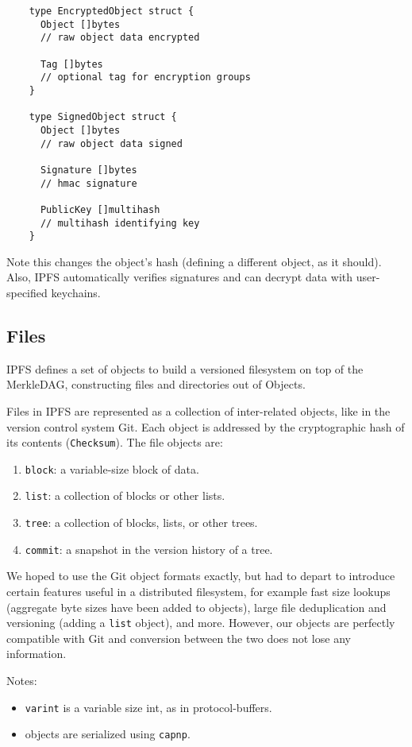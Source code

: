 \documentclass{sig-alternate}
\begin{document}
\begin{verbatim}
    type EncryptedObject struct {
      Object []bytes
      // raw object data encrypted

      Tag []bytes
      // optional tag for encryption groups
    }

    type SignedObject struct {
      Object []bytes
      // raw object data signed

      Signature []bytes
      // hmac signature

      PublicKey []multihash
      // multihash identifying key
    }
\end{verbatim}

Note this changes the object's hash (defining a different object, as it should). Also, IPFS automatically verifies signatures and can decrypt data with user-specified keychains.


\subsection{Files}

IPFS defines a set of objects to build a versioned filesystem on top of the
MerkleDAG, constructing files and directories out of Objects.


Files in IPFS are represented as a collection of inter-related objects, like in
the version control system Git. Each object is addressed by the cryptographic
hash of its contents (\texttt{Checksum}). The file objects are:

\begin{enumerate}
  \item \texttt{block}: a variable-size block of data.
  \item \texttt{list}: a collection of blocks or other lists.
  \item \texttt{tree}: a collection of blocks, lists, or other trees.
  \item \texttt{commit}: a snapshot in the version history of a tree.
\end{enumerate}

We hoped to use the Git object formats exactly, but had to depart to introduce
certain features useful in a distributed filesystem, for example fast size
lookups (aggregate byte sizes have been added to objects), large file
deduplication and versioning (adding a \texttt{list} object), and more.
However, our objects are perfectly compatible with Git and
conversion between the two does not lose any information.

Notes:
\begin{itemize}
  \item \texttt{varint} is a variable size int, as in protocol-buffers.
  \item objects are serialized using \texttt{capnp}.
\end{itemize}
\end{document}
